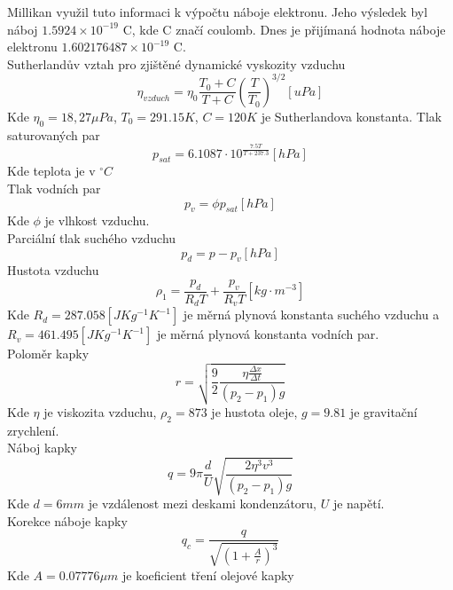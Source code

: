\documentclass{article}
\begin{document}
Millikan využil tuto informaci k výpočtu náboje elektronu. Jeho výsledek byl náboj $1.5924 \times 10^{-19}$ C, kde C značí coulomb. Dnes je přijímaná hodnota náboje elektronu $1.602176487 \times 10^{-19}$ C.\\

Sutherlandův vztah pro zjištěné dynamické vyskozity vzduchu
\begin{equation}\label{eq:vis}
  \eta_{vzduch} = \eta_{0} \frac{T_{0} + C}{T + C} \left( \frac{T}{T_{0}} \right)^{3/2} [uPa]
\end{equation}
Kde $\eta_{0} = 18,27 \mu Pa$, $T_{0} = 291.15K$, $C = 120 K$ je Sutherlandova konstanta.
Tlak saturovaných par
\begin{equation}
  p_{sat} = 6.1087 \cdot 10^{\frac{7.5T}{T+237.3}} [hPa]
\end{equation}
Kde teplota je v $^{\circ}C$\\
Tlak vodních par
\begin{equation}
  p_{v} = \phi p_{sat} [hPa]
\end{equation}
Kde $\phi$ je vlhkost vzduchu.\\
Parciální tlak suchého vzduchu
\begin{equation}
  p_{d} = p - p_{v} [hPa]
\end{equation}
Hustota vzduchu
\begin{equation}\label{eq:p1}
  \rho_{1} = \frac{p_{d}}{R_{d}T} + \frac{p_{v}}{R_{v}T} [kg \cdot m^{-3}]
\end{equation}
Kde $R_{d} = 287.058 [J Kg^{-1} K^{-1}]$ je měrná plynová konstanta suchého vzduchu a
$R_{v} = 461.495[J Kg^{-1} K^{-1}]$ je měrná plynová konstanta vodních par.\\

Poloměr kapky
\begin{equation}
  r = \sqrt{\frac{9}{2} \frac{\eta \frac{\Delta x}{\Delta t}}{(p_{2} - p_{1})g}}
\end{equation}
Kde $\eta$ je viskozita vzduchu, $\rho_{2} = 873$ je hustota oleje, $g = 9.81$ je gravitační zrychlení.\\
Náboj kapky
\begin{equation}
  q = 9 \pi \frac{d}{U} \sqrt{\frac{2 \eta^{3} v^{3}}{(p_{2} - p_{1})g}}
\end{equation}
Kde $d = 6mm$ je vzdálenost mezi deskami kondenzátoru, $U$ je napětí.\\
Korekce náboje kapky
\begin{equation}
  q_{c} = \frac{q}{\sqrt{ \left(1+\frac{A}{r} \right)^{3}}}
\end{equation}
Kde $A = 0.07776 \mu m$ je koeficient tření olejové kapky
\newpage
\end{document}
